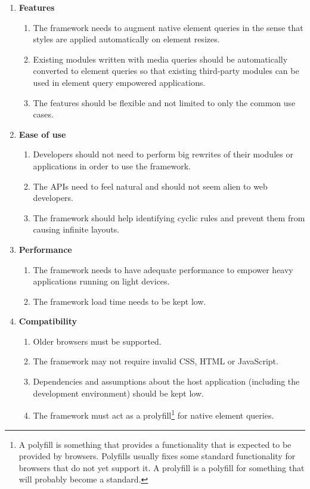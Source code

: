 \documentclass[a4paper,11pt]{kth-mag}
\begin{document}
        \begin{enumerate}
          \item \textbf{Features}
            \begin{enumerate}
              \item\label{itm:req_resize_detect} The framework needs to augment \gls{native} element queries in the sense that styles are applied automatically on \gls{element} resizes.
              \item Existing modules written with \gls{media queries} should be automatically converted to element queries so that existing third-party modules can be used in element query empowered applications.
              \item The features should be flexible and not limited to only the common use cases.
            \end{enumerate}
          \item \textbf{Ease of use}
            \begin{enumerate}
              \item\label{itm:req_big_rewrite} Developers should not need to perform big rewrites of their modules or applications in order to use the framework.
              \item\label{itm:natural} The \glspl{API} need to feel natural and should not seem alien to \gls{web} developers.
              \item The framework should help identifying cyclic rules and prevent them from causing infinite layouts.
            \end{enumerate}
          \item \textbf{Performance}
            \begin{enumerate}
              \item The framework needs to have adequate performance to empower heavy applications running on light devices.
              \item The framework load time needs to be kept low.
            \end{enumerate}
          \item \textbf{Compatibility}
            \begin{enumerate}
              \item Older \glspl{browser} must be supported.
              \item The framework may not require invalid \gls{CSS}, \gls{HTML} or \gls{JavaScript}.
              \item\label{itm:assumption} Dependencies and assumptions about the host application (including the development environment) should be kept low.
              \item\label{itm:req_prolyfill} The framework must act as a prolyfill\footnote{A polyfill is something that provides a functionality that is expected to be provided  by \glspl{browser}. Polyfills usually fixes some standard functionality for \glspl{browser} that do not yet support it. A prolyfill is a polyfill for something that will probably become a standard.} for \gls{native} element queries.
            \end{enumerate}
        \end{enumerate}
\end{document}
